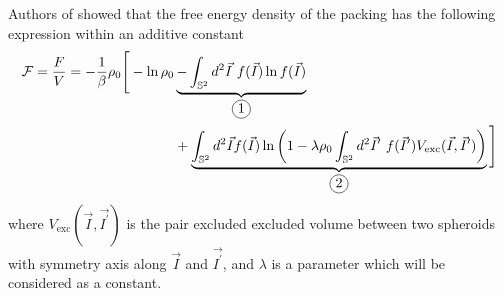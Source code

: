 \documentclass[class=article, float=false, crop=false]{standalone}
\begin{document}

Authors of \cite{nascimento2017density} showed that the free energy density of the packing has the following expression within an additive constant
\begin{equation}
\begin{aligned}
\mathcal{F} = \frac{F}{V} = - \frac{1}{\beta}\rho_0 \Bigg[- \ln\rho_0 &\underbrace{-\int_{\mathbb{S}^2} d^2\vec{I}~ f(\vec{I})\ln f(\vec{I})}_{\encircle{1}}\\
&+ \underbrace{\int_{\mathbb{S}^2} d^2\vec{I} f(\vec{I}) \ln\left(1-\lambda\rho_0\int_{\mathbb{S}^2}d^2\vec{I}^{\prime}~ f(\vec{I}^{\prime})V_{\text{exc}}(\vec{I},\vec{I}^{\prime})\right)}_{\encircle{2}}\Bigg]
\end{aligned}
\label{free_energy_1_2}
\end{equation}
where $V_{\text{exc}}(\vec{I},\vec{I^{\prime}})$ is the pair excluded excluded volume between two spheroids with symmetry axis along $\vec{I}$ and $\vec{I^{\prime}}$, and $\lambda$ is a parameter which will be considered as a constant.\\
\end{document}
